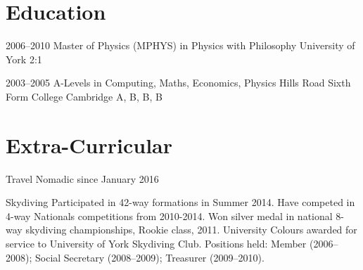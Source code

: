\documentclass[10pt,a4paper,sans]{moderncv}
\begin{document}
\section{Education}

\cventry
  {2006--2010}
  {Master of Physics (\small{MPHYS}) in Physics with Philosophy}
  {\newline{}University of York}
  {}
  {2:1}
  {}

\cventry
  {2003--2005}
  {A-Levels in Computing, Maths, Economics, Physics}
  {\newline{}Hills Road Sixth Form College}
  {Cambridge}
  {A, B, B, B}
  {}

\section{Extra-Curricular}

\cvline
  {Travel}
  {
    Nomadic since January 2016
  }

\cvline
  {Skydiving}
  {
    Participated in 42-way formations in Summer 2014.
    \newline{}Have competed in 4-way Nationals competitions from 2010-2014.
    \newline{}Won silver medal in national 8-way skydiving championships, Rookie class, 2011.
    \newline{}University Colours awarded for service to University of York Skydiving Club. Positions held: Member (2006--2008); Social Secretary (2008--2009); Treasurer (2009--2010).
  }
\end{document}
